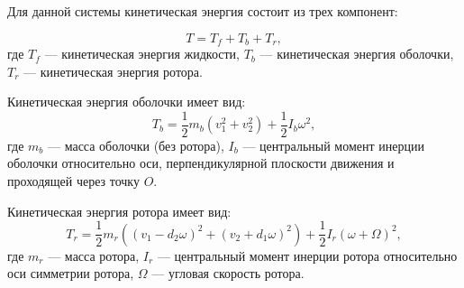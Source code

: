 %

Для данной системы кинетическая энергия состоит из трех компонент:

\begin{equation}
T = T_f + T_b + T_r,
\label{eq.kineticGeneral}
\end{equation}
где $ T_f $ --- кинетическая энергия жидкости, $ T_b $ --- кинетическая энергия оболочки, $ T_r $ --- кинетическая энергия ротора.

Кинетическая энергия оболочки имеет вид:
\begin{equation*}
T_b = \frac{1}{2}m_b( v_1^2 + v_2^2 ) + \frac{1}{2}I_b \omega^2,
\end{equation*}
где $ m_b $ --- масса оболочки (без ротора), $ I_b $ --- центральный момент инерции оболочки относительно оси, перпендикулярной плоскости движения и проходящей через точку $ O $. 

Кинетическая энергия ротора имеет вид:
\begin{equation*}
T_r = \frac{1}{2}m_r( (v_1 - d_2 \omega)^2 + (v_2 + d_1 \omega)^2 ) + \frac{1}{2}I_r(\omega + \Omega)^2,
\end{equation*}
где $ m_r $ --- масса ротора, $ I_r $ --- центральный момент инерции ротора относительно оси симметрии ротора, %
$ \Omega $ --- угловая скорость ротора.

